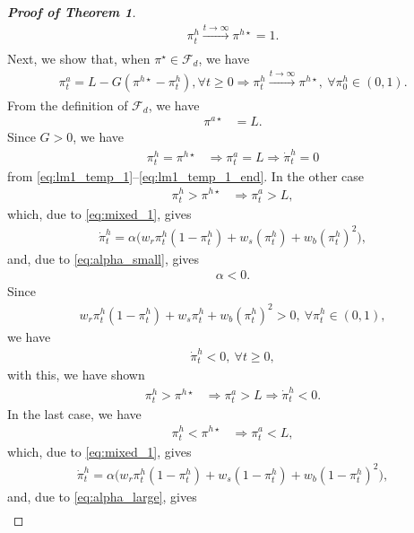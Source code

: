 \documentclass[letterpaper]{article} %
\begin{document}
\begin{proof}[\textbf{Proof of Theorem 1}]
\begin{align}\label{eq:less_than_L}
    \pi^h_t\xrightarrow[]{t\rightarrow\infty}\pi^{h \star}=1.
\end{align}
Next, we show that, when $\pi^\star\in\mathcal{F}_d$, we have
\begin{align}
    \pi^a_t=L-G(\pi^{h \star}-\pi^h_t), \forall t\geq 0\Rightarrow\pi^h_t\xrightarrow[]{t\rightarrow\infty}\pi^{h \star},\ \forall \pi^h_0\in(0,1).
\end{align}
From the definition of $\mathcal{F}_d$, we have
\begin{align}
    \pi^{a \star}&=L.
\end{align}
Since $G>0$, we have
\begin{align}
\pi^h_t=\pi^{h \star}&\Rightarrow\pi^a_t=L\Rightarrow\dot{\pi}^h_t=0 \label{eq:thm1_fd1}
\end{align}
from \eqref{eq:lm1_temp_1}--\eqref{eq:lm1_temp_1_end}. In the other case
\begin{align}
\pi^h_t>\pi^{h \star}&\Rightarrow\pi^a_t>L,
\end{align}
which, due to \eqref{eq:mixed_1}, gives
\begin{align}
    \dot{\pi}^h_t=\alpha \bigg(w_r \pi^h_t(1-\pi^h_t) + w_s (\pi^h_t) + w_b (\pi^h_t)^2  \bigg),
\end{align}
and, due to \eqref{eq:alpha_small}, gives
\begin{align}
    \alpha<0.
\end{align}
Since
\begin{align}
    w_r \pi^h_t(1-\pi^h_t) + w_s \pi^h_t + w_b (\pi^h_t)^2>0,\ \forall \pi^h_t\in(0,1),
\end{align}
we have
\begin{align}
    \dot{\pi}^h_t<0,\ \forall t\geq 0,
\end{align}
with this, we have shown
\begin{align}
\pi^h_t>\pi^{h \star}&\Rightarrow\pi^a_t>L\Rightarrow\dot{\pi}^h_t<0. \label{eq:thm1_fd2}
\end{align}
In the last case, we have
\begin{align}
\pi^h_t<\pi^{h \star}&\Rightarrow\pi^a_t<L,
\end{align}
which, due to \eqref{eq:mixed_1}, gives
\begin{align}
    \dot{\pi}^h_t=\alpha \bigg(w_r \pi^h_t(1-\pi^h_t) + w_s (1-\pi^h_t) + w_b (1-\pi^h_t)^2  \bigg),
\end{align}
and, due to \eqref{eq:alpha_large}, gives
\begin{align}

\end{align}
\end{proof}
\end{document}
